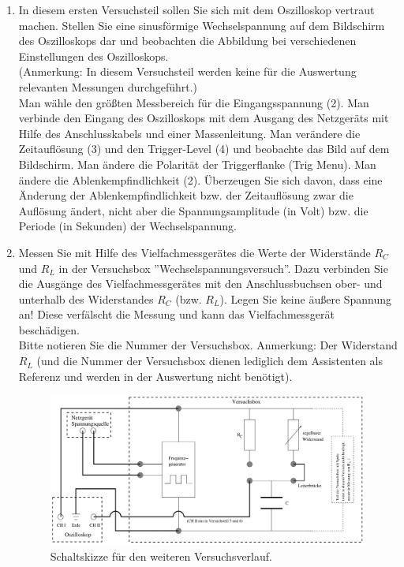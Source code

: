 \begin{enumerate}
 \item In diesem ersten Versuchsteil sollen Sie sich mit dem Oszilloskop vertraut machen. Stellen Sie eine sinusförmige Wechselspannung auf dem Bildschirm des Oszilloskops dar und beobachten die Abbildung bei verschiedenen Einstellungen des Oszilloskops.\\
  (Anmerkung: In diesem Versuchsteil werden keine für die Auswertung relevanten Messungen durchgeführt.)\\
  
  \noindent
	Man wähle den größten Messbereich für die Eingangsspannung (2). Man verbinde den Eingang des Oszilloskops mit dem Ausgang des Netzgeräts mit Hilfe des Anschlusskabels und einer Massenleitung. Man
	verändere die Zeitauflösung (3) und den Trigger-Level (4) und beobachte das Bild auf dem Bildschirm. Man ändere die Polarität der Triggerflanke (Trig Menu). Man ändere die Ablenkempfindlichkeit (2). Überzeugen Sie sich davon, dass eine Änderung der Ablenkempfindlichkeit bzw. der Zeitauflösung zwar die Auflösung ändert, nicht aber die Spannungsamplitude (in Volt) bzw. die Periode (in Sekunden) der Wechselspannung.
 \item Messen Sie mit Hilfe des Vielfachmessgerätes die Werte der Widerstände $R_C$ und $R_L$ in der Versuchsbox ''Wechselspannungsversuch''. Dazu verbinden Sie die Ausgänge des Vielfachmessgerätes mit 
 	den Anschlussbuchsen ober- und unterhalb des Widerstandes $R_C$ (bzw. $R_L$). Legen Sie keine äußere Spannung an! Diese verfälscht die Messung und kann das Vielfachmessgerät beschädigen.\\
  Bitte notieren Sie die Nummer der Versuchsbox. Anmerkung: Der Widerstand $R_L$ (und die Nummer der Versuchsbox dienen lediglich dem Assistenten als Referenz und werden in der Auswertung nicht 
  benötigt).
	
	\begin{figure}[t]
		\centering
			\includegraphics[width=\textwidth]{Versuch_15-16/Abbildungen/Schaltung.jpg}
		\caption{Schaltskizze für den weiteren Versuchsverlauf.}
		\label{fig:Schaltung}
	\end{figure}
	

\end{enumerate}
